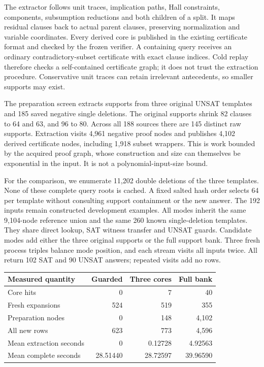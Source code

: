 \documentclass[11pt,a4paper]{article}
\numberwithin{equation}{section}
\theoremstyle{plain}
\theoremstyle{definition}
\theoremstyle{remark}
\begin{document}
The extractor follows unit traces, implication paths, Hall constraints,
components, subsumption reductions and both children of a split. It maps
residual clauses back to actual parent clauses, preserving normalization and
variable coordinates. Every derived core is published in the existing
certificate format and checked by the frozen verifier. A containing query
receives an ordinary contradictory-subset certificate with exact clause
indices. Cold replay therefore checks a self-contained certificate graph;
it does not trust the extraction procedure. Conservative unit traces can retain
irrelevant antecedents, so smaller supports may exist.

The preparation screen extracts supports from three original UNSAT templates
and 185 saved negative single deletions. The original supports shrink 82
clauses to 64 and 63, and 96 to 80. Across all 188 sources there are 145 distinct
raw supports. Extraction visits 4,961 negative proof nodes and publishes 4,102
derived certificate nodes, including 1,918 subset wrappers. This is work bounded
by the acquired proof graph, whose construction and size can themselves be
exponential in the input. It is not a polynomial-input-size bound.

For the comparison, we enumerate 11,202 double deletions of the three templates.
None of these complete query roots is cached. A fixed salted hash order selects
64 per template without consulting support containment or the new answer. The
192 inputs remain constructed development examples. All modes inherit the same
9,104-node reference union and the same 260 known single-deletion templates.
They share direct lookup, SAT witness transfer and UNSAT guards. Candidate modes
add either the three original supports or the full support bank. Three fresh
process triples balance mode position, and each stream visits all inputs twice.
All return 102 SAT and 90 UNSAT answers; repeated visits add no rows.

\begin{center}
\begin{tabular}{lrrr}
\hline
Measured quantity & Guarded & Three cores & Full bank \\
\hline
Core hits & 0 & 7 & 40 \\
Fresh expansions & 524 & 519 & 355 \\
Preparation nodes & 0 & 148 & 4,102 \\
All new rows & 623 & 773 & 4,596 \\
Mean extraction seconds & 0 & 0.12728 & 4.92563 \\
Mean complete seconds & 28.51440 & 28.72597 & 39.96590 \\
\hline
\end{tabular}
\end{center}
\end{document}
